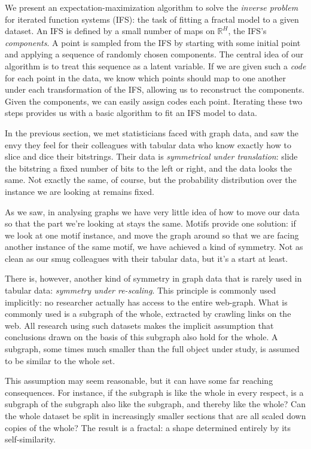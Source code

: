 
\begin{summary}
We present an expectation-maximization algorithm to solve the \emph{inverse problem} for iterated function systems (IFS): the task of fitting a fractal model to a given dataset. An IFS is defined by a small number of maps on $\mathbb{R}^H$, the IFS's \emph{components}. A point is sampled from the IFS by starting with some initial point and applying a sequence of randomly chosen components. The central idea of our algorithm is to treat this sequence as a latent variable. If we are given such a \emph{code} for each point in the data, we know which points should map to one another under each transformation of the IFS, allowing us to reconstruct the components. Given the components, we can easily assign codes each point. Iterating these two steps provides us with a basic algorithm to fit an IFS model to data.
\end{summary}

In the previous section, we met statisticians faced with graph data, and saw the envy they feel for their colleagues with tabular data who know exactly how to slice and dice their bitstrings. Their data is \emph{symmetrical under translation}: slide the bitstring a fixed number of bits to the left or right, and the data looks the same. Not exactly the same, of course, but the probability distribution over the instance we are looking at remains fixed.

As we saw, in analysing graphs we have very little idea of how to move our data so that the part we're looking at stays the same. Motifs provide one solution: if we look at one motif instance, and move the graph around so that we are facing another instance of the same motif, we have achieved a kind of symmetry. Not as clean as our smug colleagues with their tabular data, but it's a start at least.

There is, however, another kind of symmetry in graph data that is rarely used in tabular data: \emph{symmetry under re-scaling}. This principle is commonly used implicitly: no researcher actually has access to the entire web-graph. What is commonly used is a subgraph of the whole, extracted by crawling links on the web. All research using such datasets makes the implicit assumption that conclusions drawn on the basis of this subgraph also hold for the whole. A subgraph, some times much smaller than the full object under study, is assumed to be similar to the whole set.

This assumption may seem reasonable, but it can have some far reaching consequences. For instance, if the subgraph is like the whole in every respect, is a subgraph of the subgraph also like the subgraph, and thereby like the whole? Can the whole dataset be split in increasingly smaller sections that are all scaled down copies of the whole? The result is a fractal: a shape determined entirely by its self-similarity.

